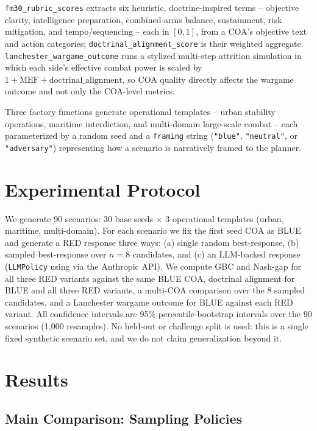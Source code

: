 \documentclass[letterpaper]{article} %
\begin{document}
\texttt{fm30\_rubric\_scores} extracts six heuristic, doctrine-inspired terms -- objective clarity, intelligence preparation, combined-arms balance, sustainment, risk mitigation, and tempo/sequencing -- each in $[0,1]$, from a COA's objective text and action categories; \texttt{doctrinal\_alignment\_score} is their weighted aggregate. \texttt{lanchester\_wargame\_outcome} runs a stylized multi-step attrition simulation in which each side's effective combat power is scaled by $1 + \mathrm{MEF} + \mathrm{doctrinal\_alignment}$, so COA quality directly affects the wargame outcome and not only the COA-level metrics.

Three factory functions generate operational templates -- urban stability operations, maritime interdiction, and multi-domain large-scale combat -- each parameterized by a random seed and a \texttt{framing} string (\texttt{"blue"}, \texttt{"neutral"}, or \texttt{"adversary"}) representing how a scenario is narratively framed to the planner.

\section{Experimental Protocol}

We generate 90 scenarios: 30 base seeds $\times$ 3 operational templates (urban, maritime, multi-domain). For each scenario we fix the first seed COA as BLUE and generate a RED response three ways: (a) single random best-response, (b) sampled best-response over $n=8$ candidates, and (c) an LLM-backed response (\texttt{LLMPolicy} using  via the Anthropic API). We compute GBC and Nash-gap for all three RED variants against the same BLUE COA, doctrinal alignment for BLUE and all three RED variants, a multi-COA comparison over the 8 sampled candidates, and a Lanchester wargame outcome for BLUE against each RED variant. All confidence intervals are 95\% percentile-bootstrap intervals over the 90 scenarios (1{,}000 resamples). No held-out or challenge split is used: this is a single fixed synthetic scenario set, and we do not claim generalization beyond it.

\section{Results}

\subsection{Main Comparison: Sampling Policies}
\end{document}
